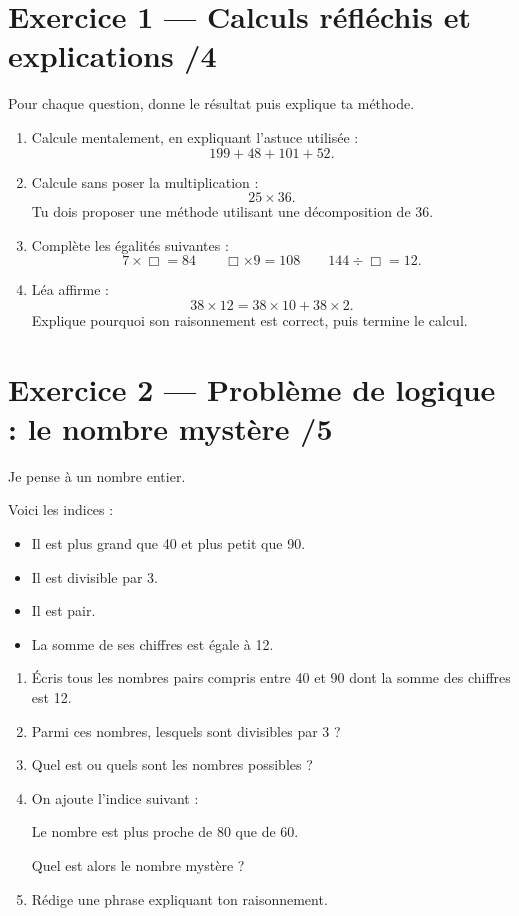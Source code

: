 \documentclass[11pt,a4paper]{article}
\begin{document}
\newpage

\section*{Exercice 1 — Calculs réfléchis et explications \hfill /4}

Pour chaque question, donne le résultat puis explique ta méthode.

\begin{enumerate}[label=\textbf{\arabic*)}]
    \item Calcule mentalement, en expliquant l'astuce utilisée :
    \[
    199 + 48 + 101 + 52.
    \]

    \item Calcule sans poser la multiplication :
    \[
    25 \times 36.
    \]
    Tu dois proposer une méthode utilisant une décomposition de 36.

    \item Complète les égalités suivantes :
    \[
    7 \times \Box = 84
    \qquad
    \Box \times 9 = 108
    \qquad
    144 \div \Box = 12.
    \]

    \item Léa affirme :
    \[
    38 \times 12 = 38 \times 10 + 38 \times 2.
    \]
    Explique pourquoi son raisonnement est correct, puis termine le calcul.
\end{enumerate}

\vspace{4mm}

\section*{Exercice 2 — Problème de logique : le nombre mystère \hfill /5}

Je pense à un nombre entier.

Voici les indices :

\begin{itemize}
    \item Il est plus grand que 40 et plus petit que 90.
    \item Il est divisible par 3.
    \item Il est pair.
    \item La somme de ses chiffres est égale à 12.
\end{itemize}

\begin{enumerate}[label=\textbf{\arabic*)}]
    \item Écris tous les nombres pairs compris entre 40 et 90 dont la somme des chiffres est 12.
    \item Parmi ces nombres, lesquels sont divisibles par 3 ?
    \item Quel est ou quels sont les nombres possibles ?
    \item On ajoute l'indice suivant :
    \begin{center}
    \og Le nombre est plus proche de 80 que de 60. \fg
    \end{center}
    Quel est alors le nombre mystère ?
    \item Rédige une phrase expliquant ton raisonnement.
\end{enumerate}
\end{document}
